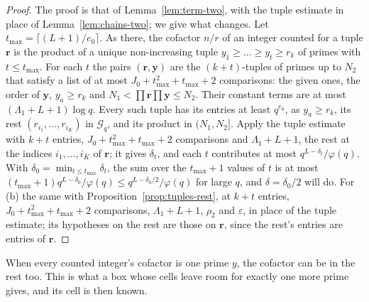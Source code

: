 \documentclass[11pt]{article}
\theoremstyle{definition}
\begin{document}
\begin{proof}
The proof is that of Lemma~\ref{lem:term-two}, with the tuple estimate in place of Lemma~\ref{lem:chains-two}; we give
what changes. Let $t_{\max} = \lceil (L + 1)/e_0 \rceil$. As there, the cofactor $n/r$ of an integer counted for a
tuple $\mathbf r$ is the product of a unique non-increasing tuple $y_1 \ge \dots \ge y_t \ge r_k$ of primes with $t \le
t_{\max}$. For each $t$ the pairs $(\mathbf r, \mathbf y)$ are the $(k + t)$-tuples of primes up
to $N_2$ that satisfy a list of at most $J_0 + t_{\max}^2 + t_{\max} + 2$ comparisons: the given ones, the order of
$\mathbf y$, $y_a \ge r_k$ and $N_1 < \prod \mathbf r \prod \mathbf y \le N_2$. Their constant terms are at most
$(\Lambda_1 + L + 1)\log q$. Every such tuple has its entries at least $q^{e_0}$, as $y_a \ge r_k$, its rest $(r_{i_1},
\dots, r_{i_K})$ in $\mathcal G_q$, and its product in $(N_1, N_2]$. Apply the tuple estimate with $k + t$ entries, $J_0
+ t_{\max}^2 + t_{\max} + 2$ comparisons and $\Lambda_1 + L + 1$, the rest at the indices $i_1, \dots, i_K$ of
$\mathbf r$; it gives $\delta_t$, and each $t$ contributes at most $q^{L - \delta_t}/\varphi(q)$. With $\delta_0 =
\min_{t \le
t_{\max}} \delta_t$, the sum over the $t_{\max} + 1$ values of $t$ is at most $(t_{\max} + 1) q^{L -
\delta_0}/\varphi(q) \le q^{L - \delta_0/2}/\varphi(q)$ for large $q$, and $\delta = \delta_0/2$ will do. For (b) the
same with Proposition~\ref{prop:tuples-rest}, at $k + t$ entries, $J_0 + t_{\max}^2 + t_{\max} + 2$ comparisons,
$\Lambda_1 + L + 1$, $\rho_2$ and $\varepsilon$, in place of the tuple estimate; its hypotheses on the rest are those on
$\mathbf r$, since the rest's entries are entries of $\mathbf r$.
\end{proof}

When every counted integer's cofactor is one prime $y$, the cofactor can be in the rest too. This is what a box whose
cells leave room for exactly one more prime gives, and its cell is then known.
\end{document}
